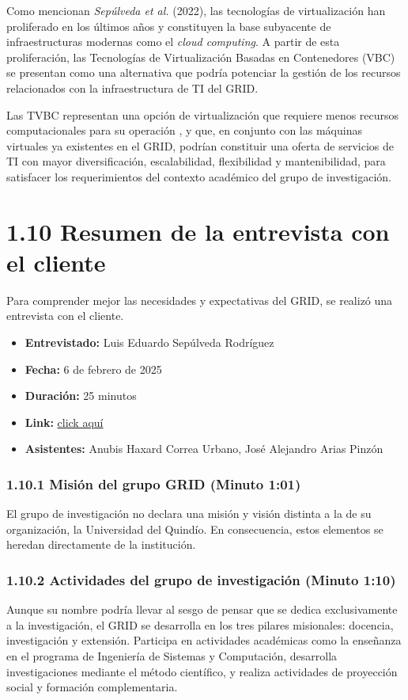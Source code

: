 Como mencionan \textit{Sepúlveda et al.} (2022), las tecnologías de virtualización han proliferado en los últimos años y constituyen la base subyacente de infraestructuras modernas como el \textit{cloud computing}. A partir de esta proliferación, las Tecnologías de Virtualización Basadas en Contenedores (VBC) se presentan como una alternativa que podría potenciar la gestión de los recursos relacionados con la infraestructura de TI del GRID.

Las TVBC representan una opción de virtualización que requiere menos recursos computacionales para su operación \citep{Xavier2013}, y que, en conjunto con las máquinas virtuales ya existentes en el GRID, podrían constituir una oferta de servicios de TI con mayor diversificación, escalabilidad, flexibilidad y mantenibilidad, para satisfacer los requerimientos del contexto académico del grupo de investigación.

\section*{1.10 Resumen de la entrevista con el cliente}

Para comprender mejor las necesidades y expectativas del GRID, se realizó una entrevista con el cliente.

\begin{itemize}
  \item \textbf{Entrevistado:} Luis Eduardo Sepúlveda Rodríguez
  \item \textbf{Fecha:} 6 de febrero de 2025
  \item \textbf{Duración:} 25 minutos
  \item \textbf{Link:} \href{https://drive.google.com/file/d/1rIc9xOsyDqumlTV-QXcw0inPyIbSEHLz/view?usp=sharing}{click aquí}
  \item \textbf{Asistentes:} Anubis Haxard Correa Urbano, José Alejandro Arias Pinzón
\end{itemize}

\subsubsection*{1.10.1 Misión del grupo GRID (Minuto 1:01)}
El grupo de investigación no declara una misión y visión distinta a la de su organización, la Universidad del Quindío. En consecuencia, estos elementos se heredan directamente de la institución.

\subsubsection*{1.10.2 Actividades del grupo de investigación (Minuto 1:10)}
Aunque su nombre podría llevar al sesgo de pensar que se dedica exclusivamente a la investigación, el GRID se desarrolla en los tres pilares misionales: docencia, investigación y extensión. Participa en actividades académicas como la enseñanza en el programa de Ingeniería de Sistemas y Computación, desarrolla investigaciones mediante el método científico, y realiza actividades de proyección social y formación complementaria.

